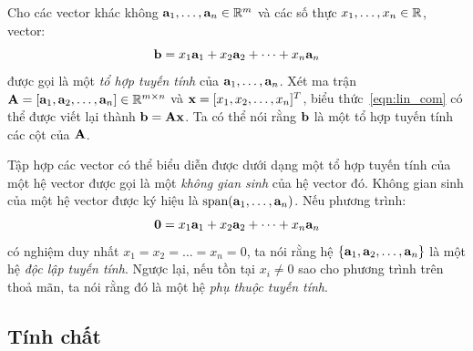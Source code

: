 Cho các vector khác không $\mathbf{a}_1, \dots, \mathbf{a}_n \in \mathbb{R}^m$ và các số thực $x_1,
\dots, x_n \in \mathbb{R}$,
vector:
\begin{equation}
\label{eqn:lin_com}
\mathbf{b} = x_1\mathbf{a}_1 + x_2\mathbf{a}_2 + \dots + x_n \mathbf{a}_n
\end{equation}
được gọi là một \textit{tổ hợp tuyến tính} của $\mathbf{a}_1, \dots, \mathbf{a}_n$. Xét ma
trận $\mathbf{A} = [\mathbf{a}_1, \mathbf{a}_2, \dots, \mathbf{a}_n] \in
\mathbb{R}^{m\times n}$ và $\mathbf{x} = [x_1, x_2, \dots, x_n]^T$, biểu
thức~\eqref{eqn:lin_com} có thể được viết lại thành $\mathbf{b} = \mathbf{A}\mathbf{x}$. Ta có thể
nói rằng $\mathbf{b}$ là một tổ hợp tuyến tính các cột của $\mathbf{A}$.


Tập hợp các vector có thể biểu diễn được dưới dạng một tổ hợp tuyến tính
của một hệ vector được gọi là một \textit{không gian sinh} của hệ vector đó.
Không gian sinh của một hệ vector được ký hiệu là $\text{span}(\mathbf{a}_1,
\dots, \mathbf{a}_n)$. Nếu phương trình:
\begin{equation}
\label{eqn:lin_com0}
\mathbf{0} = x_1\mathbf{a}_1 + x_2\mathbf{a}_2 + \dots + x_n \mathbf{a}_n
\end{equation}
\noindent có nghiệm duy nhất $x_1 = x_2 = \dots = x_n = 0$, ta nói rằng hệ $
\{\mathbf{a}_1, \mathbf{a}_2, \dots, \mathbf{a}_n\}$ là một hệ \textit{độc lập tuyến tính}. Ngược
lại, nếu tồn tại $x_i \neq 0$ sao cho phương trình trên thoả mãn, ta nói rằng đó
là một hệ \textit{phụ thuộc tuyến tính}.


\subsection{Tính chất} %
\label{sub:thtt_tinh_chat}



